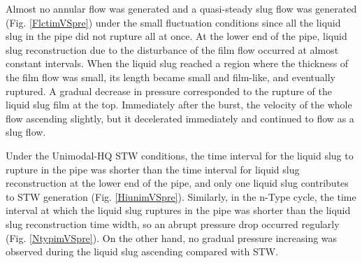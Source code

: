 \documentclass[aps,pre,preprint,groupedaddress,showkeys]{revtex4-2}
\begin{document}
Almost no annular flow was generated and a quasi-steady slug flow was generated (Fig. \ref{FlctimVSpre}) under the small fluctuation conditions since all the liquid slug in the pipe did not rupture all at once.
At the lower end of the pipe, liquid slug reconstruction due to the disturbance of the film flow occurred at almost constant intervals. 
When the liquid slug reached a region where the thickness of the film flow was small, its length became small and film-like, and eventually ruptured.
A gradual decrease in pressure corresponded to the rupture of the liquid slug film at the top.
Immediately after the burst, the velocity of the whole flow ascending slightly, but it decelerated immediately and continued to flow as a slug flow.

Under the Unimodal-HQ STW conditions, the time interval for the liquid slug to rupture in the pipe was shorter than the time interval for liquid slug reconstruction at the lower end of the pipe, and only one liquid slug contributes to STW generation (Fig. \ref{HiunimVSpre}).
Similarly, in the n-Type cycle, the time interval at which the liquid slug ruptures in the pipe was shorter than the liquid slug reconstruction time width, so an abrupt pressure drop occurred regularly (Fig. \ref{NtypimVSpre}).
On the other hand, no gradual pressure increasing was observed during the liquid slug ascending compared with STW.
\end{document}
